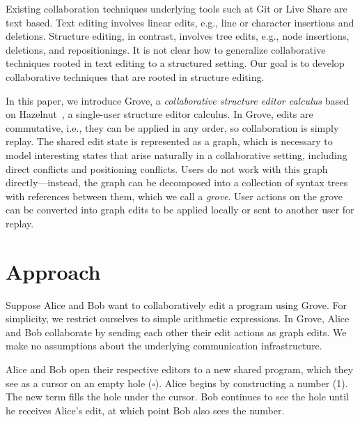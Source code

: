 \documentclass[nonacm, acmsmall, screen, review]{acmart}
\newcommand{\hole}{\ensuremath{\square}} %
\begin{document}
Existing collaboration techniques underlying tools such at Git or Live Share are text based.
Text editing involves linear edits, e.g., line or character insertions and deletions.
Structure editing, in contrast, involves tree edits, e.g., node insertions, deletions, and repositionings.
It is not clear how to generalize collaborative techniques rooted in text editing to a structured setting.
Our goal is to develop collaborative techniques that are rooted in structure editing.

In this paper, we introduce Grove, a \emph{collaborative structure editor calculus} based on Hazelnut~\cite{omar_hazelnut_2017}, a single-user structure editor calculus.
In Grove, edits are commutative, i.e., they can be applied in any order, so collaboration is simply replay.
The shared edit state is represented as a graph, which is necessary to model interesting states that arise naturally in a collaborative setting, 
including direct conflicts and positioning conflicts. 
Users do not work with this graph directly---instead, the graph can be decomposed into a collection of syntax trees with references between them, which we call a \emph{grove}.
User actions on the grove can be converted into graph edits to be applied locally or sent to another user for replay.



\section{Approach}
\label{sec:alice-and-bob}


Suppose Alice and Bob want to collaboratively edit a program using Grove.
For simplicity, we restrict ourselves to simple arithmetic expressions.
In Grove, Alice and Bob collaborate by sending each other their edit actions as graph edits.
We make no assumptions about the underlying communication infrastructure.

Alice and Bob open their respective editors to a new shared program,
which they see as a cursor on an empty hole ($\hole$).
Alice begins by constructing a number (1).
The new term fills the hole under the cursor.
Bob continues to see the hole until he receives Alice's edit,
at which point Bob also sees the number.
\end{document}
